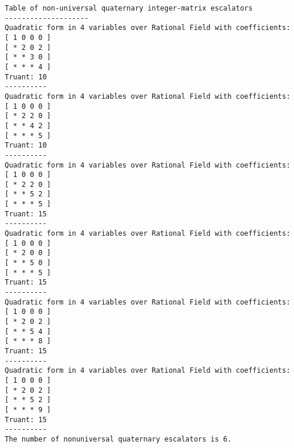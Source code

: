 \documentclass[11pt]{article}
\begin{document}
\clearpage
\begin{verbatim}
Table of non-universal quaternary integer-matrix escalators
--------------------
Quadratic form in 4 variables over Rational Field with coefficients:
[ 1 0 0 0 ]
[ * 2 0 2 ]
[ * * 3 0 ]
[ * * * 4 ]
Truant: 10
----------
Quadratic form in 4 variables over Rational Field with coefficients:
[ 1 0 0 0 ]
[ * 2 2 0 ]
[ * * 4 2 ]
[ * * * 5 ]
Truant: 10
----------
Quadratic form in 4 variables over Rational Field with coefficients:
[ 1 0 0 0 ]
[ * 2 2 0 ]
[ * * 5 2 ]
[ * * * 5 ]
Truant: 15
----------
Quadratic form in 4 variables over Rational Field with coefficients:
[ 1 0 0 0 ]
[ * 2 0 0 ]
[ * * 5 0 ]
[ * * * 5 ]
Truant: 15
----------
Quadratic form in 4 variables over Rational Field with coefficients:
[ 1 0 0 0 ]
[ * 2 0 2 ]
[ * * 5 4 ]
[ * * * 8 ]
Truant: 15
----------
Quadratic form in 4 variables over Rational Field with coefficients:
[ 1 0 0 0 ]
[ * 2 0 2 ]
[ * * 5 2 ]
[ * * * 9 ]
Truant: 15
----------
The number of nonuniversal quaternary escalators is 6.
\end{verbatim}
\end{document}
